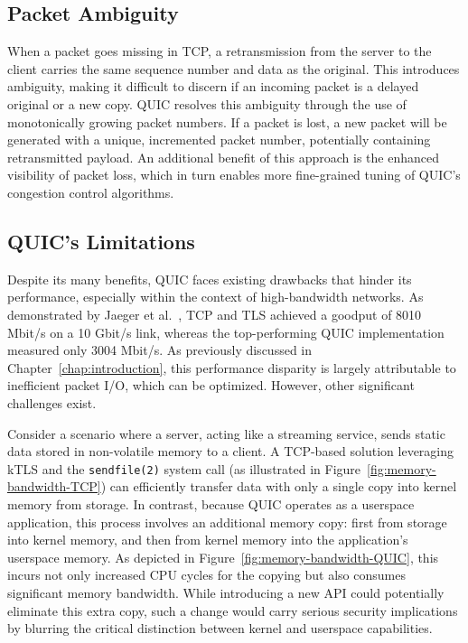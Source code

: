 \subsection{Packet Ambiguity}
\label{subsec:packet-ambiguity}
When a packet goes missing in \ac{TCP}, a retransmission from the server to the client carries the same sequence number and data as the original. This introduces ambiguity, making it difficult to discern if an incoming packet is a delayed original or a new copy. QUIC resolves this ambiguity through the use of monotonically growing packet numbers. If a packet is lost, a new packet will be generated with a unique, incremented packet number, potentially containing retransmitted payload. An additional benefit of this approach is the enhanced visibility of packet loss, which in turn enables more fine-grained tuning of QUIC's congestion control algorithms.

\subsection{QUIC's Limitations}
\label{subsec:quic-limitations}
Despite its many benefits, QUIC faces existing drawbacks that hinder its performance, especially within the context of high-bandwidth networks. As demonstrated by Jaeger et al.~\cite{10186365}, \ac{TCP} and \ac{TLS} achieved a goodput of 8010 Mbit/s on a 10 Gbit/s link, whereas the top-performing QUIC implementation measured only 3004 Mbit/s. As previously discussed in Chapter~\ref{chap:introduction}, this performance disparity is largely attributable to inefficient packet I/O, which can be optimized. However, other significant challenges exist.

Consider a scenario where a server, acting like a streaming service, sends static data stored in non-volatile memory to a client. A TCP-based solution leveraging \ac{kTLS} and the \texttt{sendfile(2)} system call (as illustrated in Figure~\ref{fig:memory-bandwidth-TCP}) can efficiently transfer data with only a single copy into kernel memory from storage. In contrast, because QUIC operates as a userspace application, this process involves an additional memory copy: first from storage into kernel memory, and then from kernel memory into the application's userspace memory. As depicted in Figure~\ref{fig:memory-bandwidth-QUIC}, this incurs not only increased CPU cycles for the copying but also consumes significant memory bandwidth. While introducing a new API could potentially eliminate this extra copy, such a change would carry serious security implications by blurring the critical distinction between kernel and userspace capabilities.

